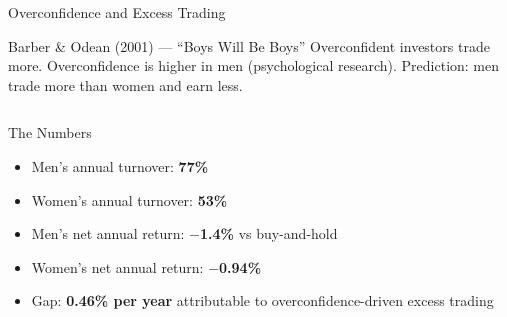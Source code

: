 \documentclass[aspectratio=169]{beamer}
\begin{document}
\begin{frame}{Overconfidence and Excess Trading}
\begin{block}{Barber \& Odean (2001) --- ``Boys Will Be Boys''}
Overconfident investors trade more. Overconfidence is higher in men (psychological research). Prediction: men trade more than women and earn less.
\end{block}
\begin{columns}
\begin{alertblock}{The Numbers}
\begin{itemize}
  \item Men's annual turnover: \textbf{77\%}
  \item Women's annual turnover: \textbf{53\%}
  \item Men's net annual return: \textbf{$-$1.4\%} vs buy-and-hold
  \item Women's net annual return: \textbf{$-$0.94\%}
  \item Gap: \textbf{0.46\% per year} attributable to overconfidence-driven excess trading
\end{itemize}
\end{alertblock}
\end{columns}
\end{frame}
\end{document}
